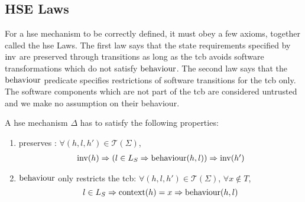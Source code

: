 \subsection{HSE Laws}
\label{subsec:speccert:laws}

For a \ac{hse} mechanism to be correctly defined, it must obey a few axioms,
together called the \ac{hse} Laws.
%
The first law says that the state requirements specified by $\mathrm{inv}$ are
preserved through transitions as long as the \ac{tcb} avoids software
transformations which do not satisfy $\mathrm{behaviour}$.
%
The second law says that the $\mathrm{behaviour}$ predicate specifies restrictions
of software transitions for the \ac{tcb} only.
%
The software components which are not part of the \ac{tcb} are considered
untrusted and we make no assumption on their behaviour.

\begin{definition}
  \label{def:laws}
  A \ac{hse} mechanism $\Delta$ has to satisfy the following properties:
  \begin{enumerate}
  \item {} preserves :
    $\forall (h, l, h') \in \mathcal{T}(\Sigma)$,
    \[
      \begin{array}{l} \mathrm{inv}(h) \Rightarrow (l \in L_S \Rightarrow
        \mathrm{behaviour}(h,l)) \Rightarrow \mathrm{inv}(h')
      \end{array}
    \]
  \item $\mathrm{behaviour}$ only restricts the \ac{tcb}:
    $\forall (h, l, h') \in \mathcal{T}(\Sigma)$, $\forall x \not\in T$,
    \[
      l \in L_S \Rightarrow \mathrm{context}(h) = x \Rightarrow
      \mathrm{behaviour}(h, l)
    \]
  \end{enumerate}
\end{definition}

